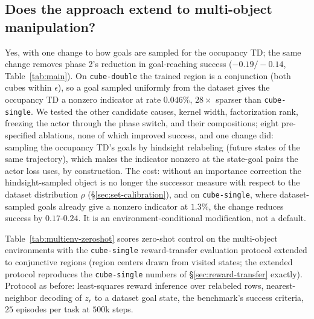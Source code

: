 \documentclass{article}
\begin{document}
\subsection{Does the approach extend to multi-object manipulation?}
\label{sec:rq4}\label{sec:multienv-zeroshot}

Yes, with one change to how goals are sampled for the occupancy TD; the same change removes phase 2's reduction in goal-reaching success ($-0.19/-0.14$, Table~\ref{tab:main}).
On \texttt{cube-double} the trained region is a conjunction (both cubes within $\epsilon$), so a goal sampled uniformly from the dataset gives the occupancy TD a nonzero indicator at rate $0.046\%$, $28\times$ sparser than \texttt{cube-single}.
We tested the other candidate causes, kernel width, factorization rank, freezing the actor through the phase switch, and their compositions; eight pre-specified ablations, none of which improved success, and one change did: sampling the occupancy TD's goals by hindsight relabeling (future states of the same trajectory), which makes the indicator nonzero at the state-goal pairs the actor loss uses, by construction.
The cost: without an importance correction the hindsight-sampled object is no longer the successor measure with respect to the dataset distribution $\rho$ (\S\ref{sec:set-calibration}), and on \texttt{cube-single}, where dataset-sampled goals already give a nonzero indicator at $1.3\%$, the change reduces success by $0.17$-$0.24$.
It is an environment-conditional modification, not a default.

Table~\ref{tab:multienv-zeroshot} scores zero-shot control on the multi-object environments with the \texttt{cube-single} reward-transfer evaluation protocol extended to conjunctive regions (region centers drawn from visited states; the extended protocol reproduces the \texttt{cube-single} numbers of \S\ref{sec:reward-transfer} exactly).
Protocol as before: least-squares reward inference over relabeled rows, nearest-neighbor decoding of $z_r$ to a dataset goal state, the benchmark's success criteria, $25$ episodes per task at $500$k steps.
\end{document}
